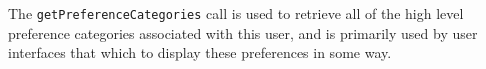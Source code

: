 The \verb+getPreferenceCategories+ call is used to retrieve all of the high level preference categories associated with
this user, and is primarily used by user interfaces that which to display these preferences in some way.
